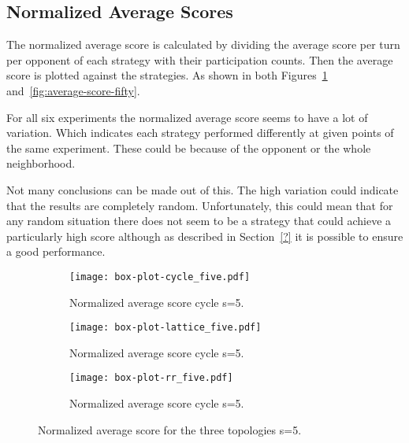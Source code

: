 \subsection{Normalized Average Scores}
\label{sub:normalized_av_score}
The normalized average score is calculated by dividing the average score per
turn per opponent
of each strategy with their participation counts. Then the average score
is plotted against the strategies. As shown in both
Figures~\ref{fig:average-score-five} and~\ref{fig:average-score-fifty}.

For all six experiments the normalized average score seems to have a lot
of variation. Which indicates each strategy performed differently at given
points of the same experiment. These could be because of the opponent or the
whole neighborhood.

Not many conclusions can be made out of this. The high variation could indicate
that the results are completely random. Unfortunately, this could mean that for
any random situation there does not seem to be a strategy that could
achieve a particularly high score although as described in Section~\ref{?} it is
possible to ensure a good performance.

\begin{figure}[!hbtp]
\centering
    \begin{subfigure}[t]{1\textwidth}
    \centering
        \texttt{[image: box-plot-cycle\_five.pdf]}
    \caption{Normalized average score cycle s=5.}
    \end{subfigure}
\hfill
    \begin{subfigure}[t]{1\textwidth}\centering
    \centering
        \texttt{[image: box-plot-lattice\_five.pdf]}
    \caption{Normalized average score cycle s=5.}
    \end{subfigure}
\hfill
    \begin{subfigure}[t]{1\textwidth}\centering
    \centering
        \texttt{[image: box-plot-rr\_five.pdf]}
    \caption{Normalized average score cycle s=5.}
    \end{subfigure}
\caption{Normalized average score for the three topologies s=5.}
\label{fig:average-score-five}
\end{figure}

